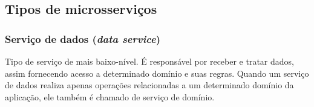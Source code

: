 
\subsection{Tipos de microsserviços}\label{fundamentacao-tipos-microsservicos}

\subsubsection{Serviço de dados (\emph{data service})}
Tipo de serviço de mais baixo-nível. É responsável por receber e tratar dados, assim fornecendo acesso a determinado domínio e suas regras. Quando um serviço de dados realiza apenas operações relacionadas a um determinado domínio da aplicação, ele também é chamado de serviço de domínio.

